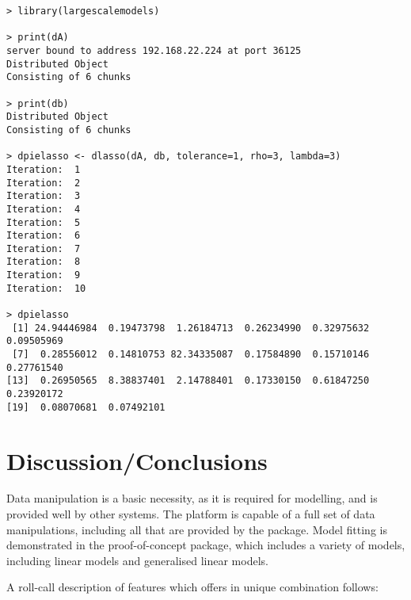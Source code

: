 \documentclass[letterpaper, inpress]{jds} %
\begin{document}
\begin{verbatim}
> library(largescalemodels)

> print(dA)
server bound to address 192.168.22.224 at port 36125
Distributed Object
Consisting of 6 chunks

> print(db)
Distributed Object
Consisting of 6 chunks

> dpielasso <- dlasso(dA, db, tolerance=1, rho=3, lambda=3)
Iteration:  1
Iteration:  2
Iteration:  3
Iteration:  4
Iteration:  5
Iteration:  6
Iteration:  7
Iteration:  8
Iteration:  9
Iteration:  10

> dpielasso
 [1] 24.94446984  0.19473798  1.26184713  0.26234990  0.32975632  0.09505969
 [7]  0.28556012  0.14810753 82.34335087  0.17584890  0.15710146  0.27761540
[13]  0.26950565  8.38837401  2.14788401  0.17330150  0.61847250  0.23920172
[19]  0.08070681  0.07492101
\end{verbatim}
                    
\section{Discussion/Conclusions}\label{sec:discussion}

Data manipulation is a basic necessity, as it is required for modelling, and is provided well by other systems.
The  platform is capable of a full set of data manipulations, including all that are provided by the  package.
Model fitting is demonstrated in the proof-of-concept  package, which includes a variety of models, including linear models and generalised linear models.

A roll-call description of features which  offers in unique combination follows:
\end{document}
